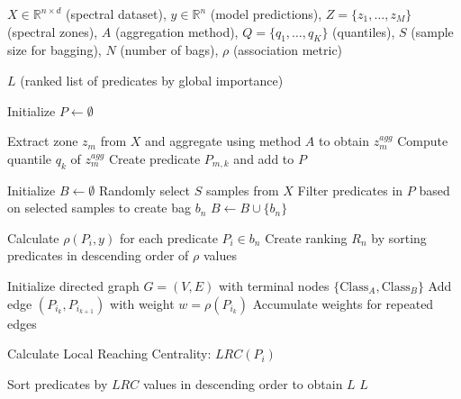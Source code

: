 \documentclass[11pt]{article}
\begin{document}
\begin{algorithm}[H]
\caption{SMeX: Spectral Model eXplainer}
\begin{algorithmic}[1]
\Require $X \in \mathbb{R}^{n \times d}$ (spectral dataset), $y \in \mathbb{R}^n$ (model predictions), $Z = \{z_1, \ldots, z_M\}$ (spectral zones), $A$ (aggregation method), $Q = \{q_1, \ldots, q_K\}$ (quantiles), $S$ (sample size for bagging), $N$ (number of bags), $\rho$ (association metric)

\Ensure $L$ (ranked list of predicates by global importance)

\State Initialize $P \leftarrow \emptyset$

    \State Extract zone $z_m$ from $X$ and aggregate using method $A$ to obtain $z_m^{agg}$
        \State Compute quantile $q_k$ of $z_m^{agg}$
        \State Create predicate $P_{m,k}$ and add to $P$
    \EndFor
\EndFor

\State Initialize $B \leftarrow \emptyset$
    \State Randomly select $S$ samples from $X$
    \State Filter predicates in $P$ based on selected samples to create bag $b_n$
    \State $B \leftarrow B \cup \{b_n\}$
\EndFor

    \State Calculate $\rho(P_i, y)$ for each predicate $P_i \in b_n$
    \State Create ranking $R_n$ by sorting predicates in descending order of $\rho$ values
\EndFor

\State Initialize directed graph $G = (V, E)$ with terminal nodes $\{\text{Class}_A, \text{Class}_B\}$
        \State Add edge $(P_{i_k}, P_{i_{k+1}})$ with weight $w = \rho(P_{i_k})$
        \State Accumulate weights for repeated edges
    \EndFor
\EndFor

    \State Calculate Local Reaching Centrality: $LRC(P_i)$
\EndFor

\State Sort predicates by $LRC$ values in descending order to obtain $L$
\State \Return $L$
\end{algorithmic}
\end{algorithm}
\end{document}
